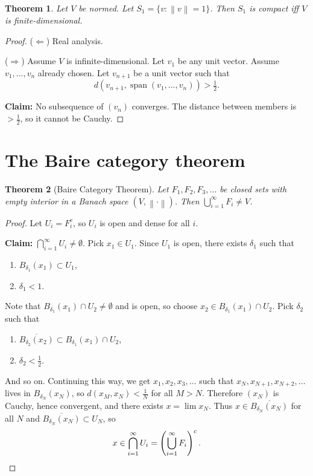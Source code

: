 \documentclass[12pt]{article}
\DeclareMathOperator{\spn}{span}
\newcommand{\norm}[1]{\left\| #1 \right\|}
\newtheorem{thm}{Theorem}[section]
\theoremstyle{definition}
\begin{document}
\begin{thm}
	Let $V$ be normed.
	Let $S_1 = \lbrace v : \norm{v} = 1 \rbrace$.
	Then $S_1$ is compact iff $V$ is finite-dimensional.
\end{thm}
\begin{proof}
	($\Leftarrow$) Real analysis.

	($\Rightarrow$) Assume $V$ is infinite-dimensional.
	Let $v_1$ be any unit vector.
	Assume $v_1, \dots, v_n$ already chosen.
	Let $v_{n+1}$ be a unit vector such that
	\begin{equation*}
		d(v_{n+1}, \spn(v_1, \dots, v_n)) > \tfrac{1}{2}.
	\end{equation*}

	\textbf{Claim: } No subsequence of $(v_n)$ converges.
	The distance between members is $> \frac{1}{2}$, so it cannot be Cauchy.
\end{proof}

\section{The Baire category theorem}

\begin{thm}[Baire Category Theorem]
	Let $F_1, F_2, F_3, \dots$ be closed sets with empty interior in a Banach space $(V, \norm{\cdot})$.
	Then $\bigcup_{i=1}^\infty F_i \neq V$.
\end{thm}
\begin{proof}
	Let $U_i = F_i^c$, so $U_i$ is open and dense for all $i$.

	\textbf{Claim: } $\bigcap_{i=1}^\infty U_i \neq \emptyset$.
	Pick $x_1 \in U_1$.
	Since $U_1$ is open, there exists $\delta_1$ such that
	\begin{enumerate}[label=(\roman*),nosep]
		\item $B_{\delta_1}(x_1) \subset U_1$,
		\item $\delta_1 < 1$.
	\end{enumerate}
	Note that $B_{\delta_1}(x_1) \cap U_2 \neq \emptyset$ and is open, so choose $x_2 \in B_{\delta_1}(x_1) \cap U_2$.
	Pick $\delta_2$ such that
	\begin{enumerate}[label=(\roman*),nosep]
		\item $\overline{B_{\delta_2}(x_2)} \subset B_{\delta_1}(x_1) \cap U_2$,
		\item $\delta_2 < \frac{1}{2}$.
	\end{enumerate}
	And so on.
	Continuing this way, we get $x_1, x_2, x_3, \dots$ such that $x_N, x_{N+1}, x_{N+2}, \dots$ lives in $B_{\delta_N}(x_N)$, so $d(x_M, x_N) < \frac{1}{N}$ for all $M > N$.
	Therefore $(x_N)$ is Cauchy, hence convergent, and there exists $x = \lim x_N$.
	Thus $x \in \overline{B_{\delta_N}(x_N)}$ for all $N$ and $\overline{B_{\delta_N}(x_N)} \subset U_N$, so
	\begin{equation*}
		x \in \bigcap_{i=1}^\infty U_i = \left( \bigcup_{i=1}^\infty F_i \right)^c. \qedhere
	\end{equation*}
\end{proof}
\end{document}
